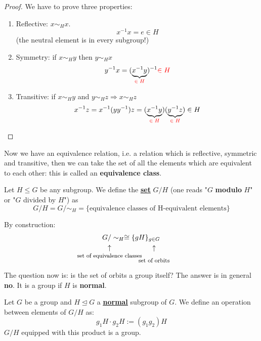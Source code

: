 \documentclass[../main.tex]{subfiles}
\begin{document}
\begin{proof}
We have to prove three properties:
\begin{enumerate}
    \item Reflective: $x\sim_H x$. 
    \[
    x^{-1}x=e\in H
    \]
    (the neutral element is in every subgroup!)
    \item Symmetry: if $x\sim_H y$ then $y\sim_H x$
    \[
    y^{-1}x=(\underbrace{x^{-1}y}_\text{{\color{red}$\in H$}})^{-1}{\color{red}\in H}
    \]
    \item Transitive: if $x\sim_H y$ and $y\sim_H z \Rightarrow x\sim_H z$
    \[
    x^{-1}z=x^{-1}(yy^{-1})z=(\underbrace{x^{-1}y}_\text{{\color{red}$\in H$}})(\underbrace{y^{-1}z}_\text{{\color{red}$\in H$}})\in H
    \]
\end{enumerate}
\end{proof}
Now we have an equivalence relation, i.e. a relation which is reflective, symmetric and transitive, then we can take the set of all the elements which are equivalent to each other: this is called an \textbf{equivalence class}.
\begin{definition}Let $H\le G$ be any subgroup. We define the \underline{\underline{\textbf{set}}} {\color{black}$G/H$} (one reads "$G$ \textbf{modulo} $H$" or "$G$ divided by $H$") as 
\[
G/H=G/\sim_H=\{\text{equivalence classes of H-equivalent elements}\}
\]
\end{definition}
By construction:
\[
G \underset{\mathclap{\tikz \node {$\uparrow$} node [below=1ex] {\footnotesize set of equivalence classes };}}{/} \sim_H\cong\{gH\}_{\underset{\mathclap{\tikz \node {$\uparrow$} node [below=2.5ex] {\footnotesize set of orbits };}}{g\in G}}
\]
The question now is: is the set of orbits a group itself? The answer is in general \textbf{no}. It is a group if $H$ is \textbf{normal}.
\begin{theorem}
Let $G$ be a group and {\color{red}$H\trianglelefteq G$} a \underline{\underline{\textbf{normal}}} subgroup of $G$. We define an operation between elements of $G/H$ as:
\[
g_1 H \cdot g_2 H:=(g_1g_2)H
\]
$G/H$ equipped with this product is a group.
\end{theorem}
\end{document}
